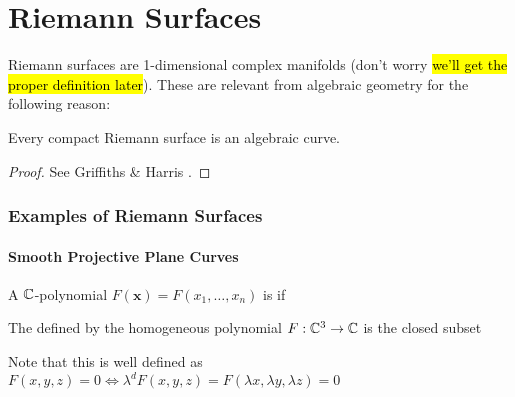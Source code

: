 \documentclass{article}
\begin{document}
\part{Riemann Surfaces}
Riemann surfaces are 1-dimensional complex manifolds (don't worry \hl{we'll get the proper definition later}). These are relevant from algebraic geometry for the following reason:
\begin{theorem}
	Every compact Riemann surface is an algebraic curve.
\end{theorem}
\begin{proof}
	See Griffiths \& Harris \cite{Griffiths2014}.
\end{proof}

\section{Examples of Riemann Surfaces}
\subsection{Smooth Projective Plane Curves}

\begin{definition}
	A $\mathbb{C}$-polynomial $F(\bm{x})=F(x_1, \dots, x_n)$ is  if 
\end{definition}

\begin{definition}
	The  defined by the homogeneous polynomial $F:\mathbb{C}^3 \to \mathbb{C}$ is the closed subset
\end{definition}

\begin{remark}
	Note that this is well defined as $F(x,y,z) = 0 \Leftrightarrow \lambda^d F(x,y,z)=F(\lambda x, \lambda y, \lambda z)=0$
\end{remark}
\end{document}
